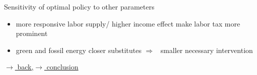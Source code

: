 \documentclass[11pt,aspectratio=169]{beamer}
\newcommand{\ar}{$\Rightarrow$ \ }
\begin{document}
\begin{frame}{Sensitivity of optimal policy to other parameters}
\begin{figure}[h!!]
\begin{subfigure}{0.4\textwidth}
	\end{subfigure}
\end{figure}
\vspace{5mm}
\begin{block}{}
	\begin{itemize}
		\item more responsive labor supply/ higher income effect make labor tax more prominent
		\item green and fossil energy closer substitutes \ar smaller necessary intervention 
	\end{itemize}
\end{block}	

\vspace{-4mm}
\hfill
\hyperlink{backOPT}{\tiny{$\rightarrow$ back,}}\hyperlink{conc}{\tiny{$\rightarrow$ conclusion}}
\end{frame}
\end{document}
